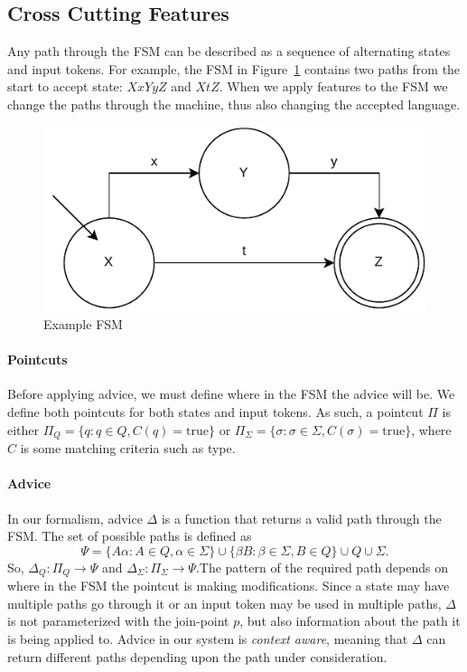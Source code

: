 \documentclass[sigplan,anonymous,review]{acmart}
\begin{document}
\subsection{Cross Cutting Features}
Any path through the FSM can be described as a sequence of alternating states and input tokens. For example, the FSM in Figure~\ref{fig:example} contains two paths from the start to accept state: $XxYyZ$ and $XtZ$. When we apply features to the FSM we change the paths through the machine, thus also changing the accepted language.

\begin{figure}
    \centering
    \includegraphics[width=0.7\linewidth]{figures/ExampleFSM.pdf}
    \caption{Example FSM}
    \label{fig:example}
\end{figure}

\paragraph{Pointcuts} Before applying advice, we must define where in the FSM the advice will be. We define both pointcuts for both states and input tokens. As such, a pointcut $\Pi$ is either $\Pi_Q = \{q : q \in Q, C(q) = \mathrm{true}\}$ or $\Pi_\Sigma = \{\sigma : \sigma \in \Sigma, C(\sigma) = \mathrm{true}\}$, where $C$ is some matching criteria such as type.

\paragraph{Advice} In our formalism, advice $\Delta$ is a function that returns a valid path through the FSM. The set of possible paths is defined as \[\Psi = \{A\alpha: A \in Q, \alpha \in \Sigma\} \cup \{\beta B: \beta \in \Sigma, B \in Q\} \cup Q \cup \Sigma.
\] So, $\Delta_Q: \Pi_Q \rightarrow \Psi$ and $\Delta_\Sigma: \Pi_\Sigma \rightarrow \Psi$.The pattern of the required path depends on where in the FSM the pointcut is making modifications. Since a state may have multiple paths go through it or an input token may be used in multiple paths, $\Delta$ is not parameterized with the join-point $p$, but also information about the path it is being applied to. Advice in our system is \emph{context aware}, meaning that $\Delta$ can return different paths depending upon the path under consideration. 
\end{document}

